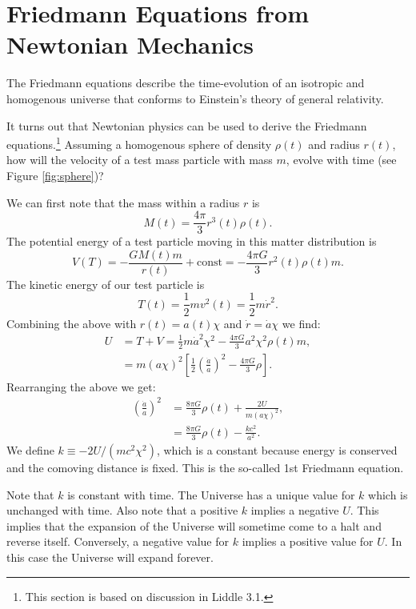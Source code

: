 \documentclass[a4paper,12pt]{article}
\theoremstyle{remark}
\newcommand{\mrm}[1]{\mathrm{#1}}
\renewcommand{\=}[1]{\stackrel{#1}{=}} %
\theoremstyle{plain}
\theoremstyle{definition}
\begin{document}
\section{Friedmann Equations from Newtonian Mechanics}
The Friedmann equations describe the time-evolution of an isotropic and homogenous universe that conforms to Einstein's theory of general relativity.

It turns out that Newtonian physics can be used to derive the Friedmann equations.\footnote{This section is based on discussion in Liddle 3.1.} Assuming a homogenous sphere of density $\rho(t)$ and radius $r(t)$, how will the velocity of a test mass particle with mass $m$, evolve with time (see Figure \ref{fig:sphere})?

We can first note that the mass within a radius $r$ is 
\begin{equation}
M(t)  = \frac{4\pi}{3} r^{3}(t) \rho(t).
\end{equation}
\hspace{-4.7cm}The potential energy of a test particle moving in this matter distribution is
\begin{equation}
V(T) = - \frac{GM(t)m}{r(t)} + \mrm{const} = - \frac{4\pi G}{3} r^{2}(t) \rho(t) m.
\end{equation}
The kinetic energy of our test particle is
\begin{equation}
T(t) = \frac{1}{2} mv^{2} (t) = \frac{1}{2} m \dot{r}^{2}.
\end{equation}
Combining the above with $r(t) = a(t) \chi$ and $\dot{r} = \dot{a} \chi$ we find: 
\begin{align}
U &= T + V = \frac{1}{2} m\dot{a}^{2} \chi^{2} - \frac{4\pi G}{3} a^{2} \chi ^{2} \rho (t) m, \\
 &= m(a \chi)^{2} \left[ \frac{1}{2} \left( \frac{\dot{a}}{a} \right)^{2} - \frac{4\pi G}{3} \rho \right].
\end{align}
Rearranging the above we get:
\begin{align}
\left( \frac{\dot{a}}{a} \right)^{2} &= \frac{8\pi G}{3} \rho(t) + \frac{2U}{m(a \chi)^{2}}, \nonumber \\
&= \frac{8\pi G}{3} \rho(t) - \frac{kc^{2}}{a^{2}}.
\label{eq:friedmann1}
\end{align}
We define $k \equiv -2U/(mc^{2}\chi^{2})$, which is a constant because energy is conserved and the comoving distance is fixed. This is the so-called 1st Friedmann equation.

Note that $k$ is constant with time. The Universe has a unique value for $k$ which is unchanged with time. Also note that a positive $k$ implies a negative $U$. This implies that the expansion of the Universe will sometime come to a halt and reverse itself. Conversely, a negative value for $k$ implies a positive value for $U$. In this case the Universe will expand forever.
\end{document}
